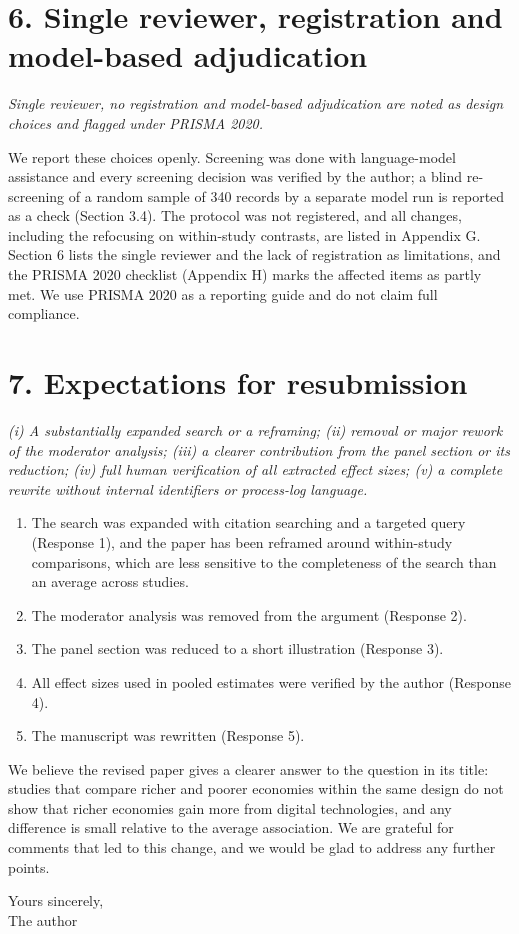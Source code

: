 \documentclass[11pt,a4paper]{article}
\newenvironment{comment}{\par\medskip\noindent\begin{minipage}{\textwidth}\itshape}{\end{minipage}\par\smallskip}
\begin{document}
\section*{6. Single reviewer, registration and model-based adjudication}
\begin{comment}
Single reviewer, no registration and model-based adjudication are noted as design choices and flagged under PRISMA 2020.
\end{comment}
We report these choices openly. Screening was done with language-model assistance and every screening decision was verified by the author; a blind re-screening of a random sample of 340 records by a separate model run is reported as a check (Section 3.4). The protocol was not registered, and all changes, including the refocusing on within-study contrasts, are listed in Appendix G. Section 6 lists the single reviewer and the lack of registration as limitations, and the PRISMA 2020 checklist (Appendix H) marks the affected items as partly met. We use PRISMA 2020 as a reporting guide and do not claim full compliance.

\section*{7. Expectations for resubmission}
\begin{comment}
(i) A substantially expanded search or a reframing; (ii) removal or major rework of the moderator analysis; (iii) a clearer contribution from the panel section or its reduction; (iv) full human verification of all extracted effect sizes; (v) a complete rewrite without internal identifiers or process-log language.
\end{comment}
\begin{enumerate}[label=(\roman*),leftmargin=2em,itemsep=2pt]
\item The search was expanded with citation searching and a targeted query (Response 1), and the paper has been reframed around within-study comparisons, which are less sensitive to the completeness of the search than an average across studies.
\item The moderator analysis was removed from the argument (Response 2).
\item The panel section was reduced to a short illustration (Response 3).
\item All effect sizes used in pooled estimates were verified by the author (Response 4).
\item The manuscript was rewritten (Response 5).
\end{enumerate}

\medskip
We believe the revised paper gives a clearer answer to the question in its title: studies that compare richer and poorer economies within the same design do not show that richer economies gain more from digital technologies, and any difference is small relative to the average association. We are grateful for comments that led to this change, and we would be glad to address any further points.

\medskip
Yours sincerely,\\
The author
\end{document}
